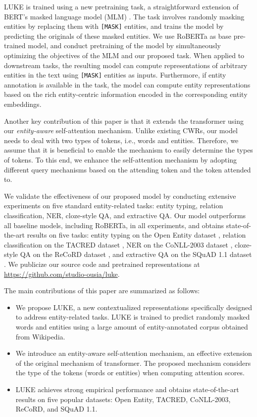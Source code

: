 \documentclass[11pt,a4paper]{article}
\begin{document}
LUKE is trained using a new pretraining task, a straightforward extension of BERT's masked language model (MLM) \cite{devlin2018bert}.
The task involves randomly masking entities by replacing them with \texttt{[MASK]} entities, and trains the model by predicting the originals of these masked entities.
We use RoBERTa as base pre-trained model, and conduct pretraining of the model by simultaneously optimizing the objectives of the MLM and our proposed task.
When applied to downstream tasks, the resulting model can compute representations of arbitrary entities in the text using \texttt{[MASK]} entities as inputs.
Furthermore, if entity annotation is available in the task, the model can compute entity representations based on the rich entity-centric information encoded in the corresponding entity embeddings.

Another key contribution of this paper is that it extends the transformer using our \textit{entity-aware} self-attention mechanism.
Unlike existing CWRs, our model needs to deal with two types of tokens, i.e., words and entities.
Therefore, we assume that it is beneficial to enable the mechanism to easily determine the types of tokens.
To this end, we enhance the self-attention mechanism by adopting different query mechanisms based on the attending token and the token attended to.

We validate the effectiveness of our proposed model by conducting extensive experiments on five standard entity-related tasks: entity typing,  relation classification, NER,  cloze-style QA, and extractive QA.
Our model outperforms all baseline models, including RoBERTa, in all experiments, and obtains state-of-the-art results on five tasks: entity typing on the Open Entity dataset \cite{Choi2018Ultra-FineTyping}, relation classification on the TACRED dataset \cite{Zhang2017Position-awareFilling}, NER on the CoNLL-2003 dataset \cite{TjongKimSang-DeMeulder:2003:CONLL}, cloze-style QA on the ReCoRD dataset \cite{Zhang2018ReCoRD:Comprehension}, and extractive QA on the SQuAD 1.1 dataset \cite{rajpurkar-etal-2016-squad}.
We publicize our source code and pretrained representations at \url{https://github.com/studio-ousia/luke}.

The main contributions of this paper are summarized as follows:
\begin{itemize}[leftmargin=10pt,topsep=1pt,itemsep=0pt]
    \item We propose LUKE, a new contextualized representations specifically designed to address entity-related tasks.
          LUKE is trained to predict randomly masked words and entities using a large amount of entity-annotated corpus obtained from Wikipedia.
    \item We introduce an entity-aware self-attention mechanism, an effective extension of the original mechanism of transformer. The proposed mechanism considers the type of the tokens (words or entities) when computing attention scores.
    \item LUKE achieves strong empirical performance and obtains state-of-the-art results on five popular datasets: Open Entity, TACRED, CoNLL-2003, ReCoRD, and SQuAD 1.1.
\end{itemize}
\end{document}
